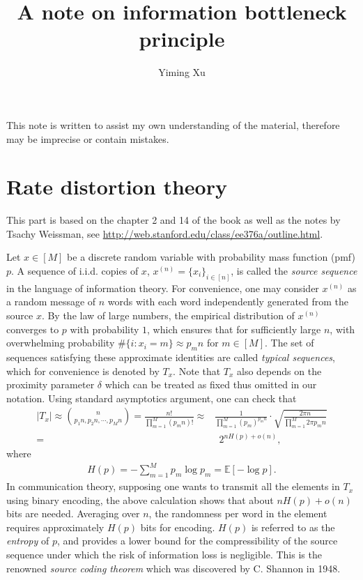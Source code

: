 \documentclass[10pt,a4paper]{amsart}
\numberwithin{equation}{section}
\theoremstyle{plain}
\theoremstyle{definition}
\def\E{{\mathbb E}}
\begin{document}
\title{\textbf{A note on information bottleneck principle}}
\date{}
\author{Yiming Xu}
\maketitle

This note is written to assist my own understanding of the material, therefore may be imprecise or contain mistakes.   

\section{Rate distortion theory}

This part is based on the chapter 2 and 14 of the book \cite{wilde2013quantum} as well as the notes by Tsachy Weissman, see \href{url}{http://web.stanford.edu/class/ee376a/outline.html}. 

Let $x\in [M]$ be a discrete random variable with probability mass function (pmf) $p$. A sequence of i.i.d. copies of $x$,  $x^{(n)}=\{x_i\}_{i\in [n]}$, is called the \emph{source sequence} in the language of information theory. For convenience, one may consider $x^{(n)}$ as a random message of $n$ words with each word independently generated from the source $x$. By the law of large numbers, the empirical distribution of $x^{(n)}$ converges to $p$ with probability $1$, which ensures that for sufficiently large $n$, with overwhelming probability $\#\{i: x_i = m\}\approx p_mn$ for $m\in [M]$. The set of sequences satisfying these approximate identities are called \emph{typical sequences}, which for convenience is denoted by $T_x$. Note that $T_x$ also depends on the proximity parameter $\delta$ which can be treated as fixed thus omitted in our notation.  Using standard asymptotics argument, one can check that
\begin{align*}
|T_x|\approx {n\choose p_1n, p_2n, \cdots, p_Mn}= \frac{n!}{\prod_{m=1}^{M}(p_mn)!}\approx&\frac{1}{\prod_{m = 1}^M (p_m)^{p_mn}}\cdot\sqrt{\frac{2\pi n}{\prod_{m=1}^M 2\pi p_m n}}\\
=&\ \ 2^{nH(p)+o(n)}, 
\end{align*}
where 
\begin{align*}
H(p) = -\sum_{m=1}^Mp_m\log p_m=\E[-\log p].
\end{align*}
In communication theory, supposing one wants to transmit all the elements in $T_x$ using binary encoding, the above calculation shows that about $nH(p)+o(n)$ bits are needed. Averaging over $n$, the randomness per word in the element requires approximately $H(p)$ bits for encoding. $H(p)$ is referred to as the \emph{entropy} of $p$, and provides a lower bound for the compressibility of the source sequence under which the risk of information loss is negligible. This is the renowned \emph{source coding theorem} which was discovered by C. Shannon in 1948. 
\end{document}

